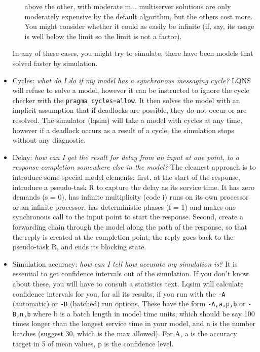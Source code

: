 \documentclass[11pt]{article}
\begin{document}
\begin{itemize}
\begin{enumerate}
  above the other, with moderate m... multiserver solutions are only
  moderately expensive by the default algorithm, but the others cost
  more. You might consider whether it could as easily be infinite (if,
  say, its usage is well below the limit so the limit is not a
  factor). 
  \end{enumerate}
  In any of these cases, you might try to simulate; there
  have been models that solved faster by simulation.
\item Cycles: \emph{what do I do if my model has a synchronous
    messaging cycle?} LQNS will refuse to solve a model, however it
  can be instructed to ignore the cycle checker with the
  \texttt{pragma~cycles=allow}. It then solves the model with an
  implicit assumption that if deadlocks are possible, they do not
  occur or are resolved.  The simulator (lqsim) will take a model
  with cycles at any time, however if a deadlock occurs as a result of
  a cycle, the simulation stops without any diagnostic.
\item Delay: \emph{how can I get the result for delay from an input at
    one point, to a response completion somewhere else in the model?}
  The cleanest approach is to introduce some special model elements:
  first, at the start of the response, introduce a pseudo-task R to
  capture the delay as its service time. It has zero demands (s = 0),
  has infinite multiplicity (code i) runs on its own processor or an
  infinite processor, has deterministic phases (f = 1) and makes one
  synchronous call to the input point to start the response. Second,
  create a forwarding chain through the model along the path of the
  response, so that the reply is created at the completion point; the
  reply goes back to the pseudo-task R, and ends its blocking state.
\item Simulation accuracy: \emph{how can I tell how accurate my
    simulation is?} It is essential to get confidence
  intervals out of
  the simulation. If you don't know about these, you will have to
  consult a statistics text. Lqsim will calculate confidence
  intervals for you, for all its results, if you run with the
  \texttt{-A} (automatic) or \texttt{-B} (batched) run options. These
  have the form \texttt{-A,a,p,b} or \texttt{-B,n,b} where b is a batch length in model
  time units, which should be say 100 times longer than the longest
  service time in your model, and n is the number batches (suggest 30,
  which is the max allowed). For A, a is the accuracy target in 5 of
  mean values, p is the confidence level.
\end{itemize}
\clearpage
\end{document}
